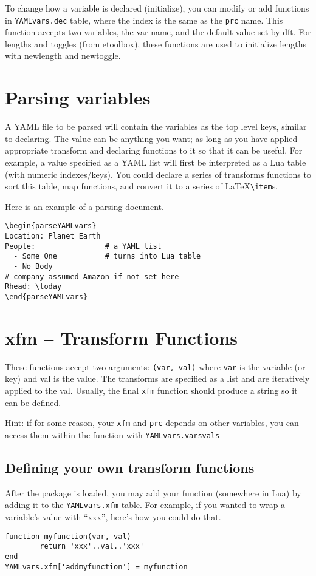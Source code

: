 \documentclass[11pt,parskip=half]{scrartcl}
\begin{document}
To change how a variable is declared (initialize), you can modify or add functions in
\texttt{YAMLvars.dec} table, where the index is the same as the \texttt{prc} name. 
This function accepts two variables, the var name, and the default value set by dft.
For lengths and toggles (from etoolbox), these functions are used to initialize lengths
with newlength and newtoggle.


\section{Parsing variables}
A YAML file to be parsed will contain the variables as the top level keys, similar to declaring.
The value can be anything you want; as long as you have applied appropriate transform and declaring
functions to it so that it can be useful. For example, a value specified as a YAML list will first be
interpreted as a Lua table (with numeric indexes/keys). You could declare a series of transforms functions
to sort this table, map functions, and convert it to a series of \LaTeX  \texttt{\textbackslash item}s.

Here is an example of a parsing document.


\begin{verbatim}
\begin{parseYAMLvars}
Location: Planet Earth
People:                # a YAML list
  - Some One           # turns into Lua table
  - No Body
# company assumed Amazon if not set here
Rhead: \today
\end{parseYAMLvars}
\end{verbatim}


 \section{xfm -- Transform Functions}
These functions accept two arguments: \texttt{(var, val)} where \texttt{var} is the variable (or key) and val is the value.
The transforms are specified as a list and are iteratively applied to the val.
Usually, the final \texttt{xfm} function should produce a string so it can be defined.

Hint: if for some reason, your \texttt{xfm} and \texttt{prc} depends on other variables,
you can access them within the function
with \texttt{YAMLvars.varsvals}

\subsection{Defining your own transform functions}
After the package is loaded, you may add your function (somewhere in Lua)
by adding it to the \texttt{YAMLvars.xfm} table.
For example, if you wanted to wrap a variable's value with ``xxx'', here's how you could do that.
\begin{verbatim}
function myfunction(var, val)
        return 'xxx'..val..'xxx'
end
YAMLvars.xfm['addmyfunction'] = myfunction
\end{verbatim}
\end{document}
